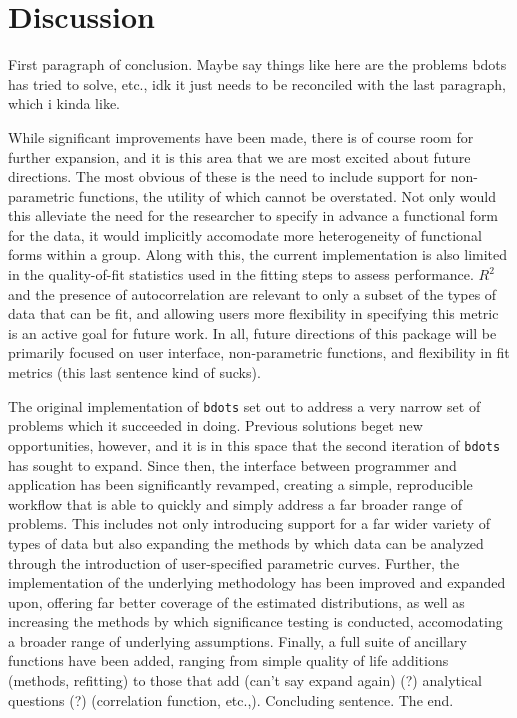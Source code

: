 \documentclass{article}
\newcommand{\xt}{\texttt}%
\begin{document}
\section{Discussion}

First paragraph of conclusion. Maybe say things like here are the problems bdots has tried to solve, etc., idk it just needs to be reconciled with the last paragraph, which i kinda like.

While significant improvements have been made, there is of course room for further expansion, and it is this area that we are most excited about future directions. The most obvious of these is the need to include support for non-parametric functions, the utility of which cannot be overstated. Not only would this alleviate the need for the researcher to specify in advance a functional form for the data, it would implicitly accomodate more heterogeneity of functional forms within a group. Along with this, the current implementation is also limited in the quality-of-fit statistics used in the fitting steps to assess performance. $R^2$ and the presence of autocorrelation are relevant to only a subset of the types of data that can be fit, and allowing users more flexibility in specifying this metric is an active goal for future work. In all, future directions of this package will be primarily focused on user interface, non-parametric functions, and flexibility in fit metrics (this last sentence kind of sucks).

The original implementation of \xt{bdots} set out to address a very narrow set of problems which it succeeded in doing. Previous solutions beget new opportunities, however, and it is in this space that the second iteration of \xt{bdots} has sought to expand. Since then, the interface between programmer and application has been significantly revamped, creating a simple, reproducible workflow that is able to quickly and simply address a far broader range of problems. This includes not only introducing support for a far wider variety of types of data but also expanding the methods by which data can be analyzed through the introduction of user-specified parametric curves. Further, the implementation of the underlying methodology has been improved and expanded upon, offering far better coverage of the estimated distributions, as well as increasing the methods by which significance testing is conducted, accomodating a broader range of underlying assumptions. Finally, a full suite of ancillary functions have been added, ranging from simple quality of life additions (methods, refitting) to those that add (can't say expand again) (?) analytical questions (?) (correlation function, etc.,). Concluding sentence. The end.
\end{document}
